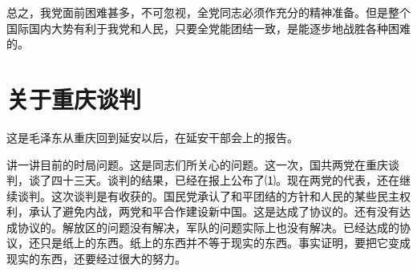 \documentclass[UTF-8, a5paper, 12pt]{ctexart}
\begin{document}
总之，我党面前困难甚多，不可忽视，全党同志必须作充分的精神准备。但是整个国际国内大势有利于我党和人民，只要全党能团结一致，是能逐步地战胜各种困难的。
\section{关于重庆谈判}

这是毛泽东从重庆回到延安以后，在延安干部会上的报告。

讲一讲目前的时局问题。这是同志们所关心的问题。这一次，国共两党在重庆谈判，谈了四十三天。谈判的结果，已经在报上公布了⑴。现在两党的代表，还在继续谈判。这次谈判是有收获的。国民党承认了和平团结的方针和人民的某些民主权利，承认了避免内战，两党和平合作建设新中国。这是达成了协议的。还有没有达成协议的。解放区的问题没有解决，军队的问题实际上也没有解决。已经达成的协议，还只是纸上的东西。纸上的东西并不等于现实的东西。事实证明，要把它变成现实的东西，还要经过很大的努力。
\end{document}
